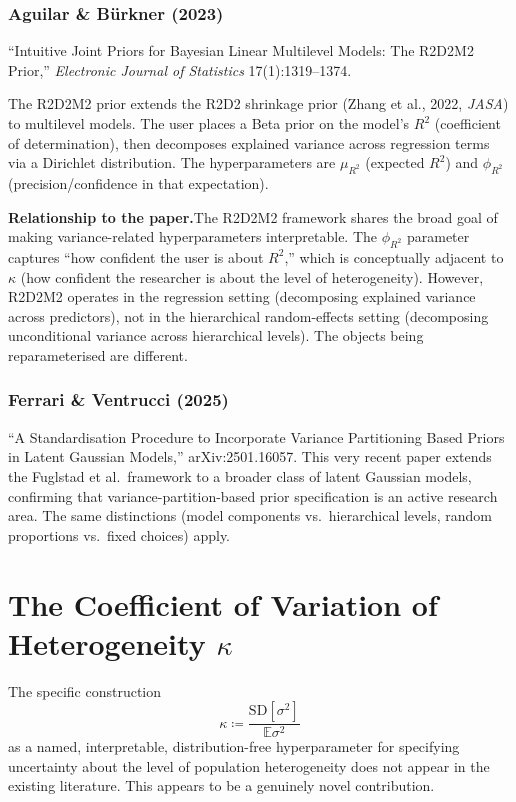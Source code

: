 \documentclass[12pt,a4paper]{article}
\newcommand{\E}{\mathbb{E}}
\newcommand{\SD}{\mathrm{SD}}
\begin{document}
\subsubsection{Aguilar \& B\"{u}rkner (2023)}

``Intuitive Joint Priors for Bayesian Linear Multilevel Models: The R2D2M2
Prior,'' \emph{Electronic Journal of Statistics} 17(1):1319--1374.

The R2D2M2 prior extends the R2D2 shrinkage prior (Zhang et al., 2022,
\emph{JASA}) to multilevel models. The user places a Beta prior on the model's
$R^2$ (coefficient of determination), then decomposes explained variance across
regression terms via a Dirichlet distribution. The hyperparameters are
$\mu_{R^2}$ (expected $R^2$) and $\phi_{R^2}$ (precision/confidence in that
expectation).

\medskip
\noindent\textbf{Relationship to the paper.}\quad The R2D2M2 framework shares
the broad goal of making variance-related hyperparameters interpretable. The
$\phi_{R^2}$ parameter captures ``how confident the user is about $R^2$,''
which is conceptually adjacent to $\kappa$ (how confident the researcher is
about the level of heterogeneity). However, R2D2M2 operates in the regression
setting (decomposing explained variance across predictors), not in the
hierarchical random-effects setting (decomposing unconditional variance across
hierarchical levels). The objects being reparameterised are different.

\subsubsection{Ferrari \& Ventrucci (2025)}

``A Standardisation Procedure to Incorporate Variance Partitioning Based Priors
in Latent Gaussian Models,'' arXiv:2501.16057. This very recent paper extends
the Fuglstad et al.\ framework to a broader class of latent Gaussian models,
confirming that variance-partition-based prior specification is an active
research area. The same distinctions (model components vs.\ hierarchical
levels, random proportions vs.\ fixed choices) apply.


\section{The Coefficient of Variation of Heterogeneity $\kappa$}

The specific construction
\[
  \kappa \coloneqq \frac{\SD[\sigma^2]}{\E{\sigma^2}}
\]
as a named, interpretable, distribution-free hyperparameter for specifying
uncertainty about the level of population heterogeneity does not appear in
the existing literature. This appears to be a genuinely novel contribution.
\end{document}

